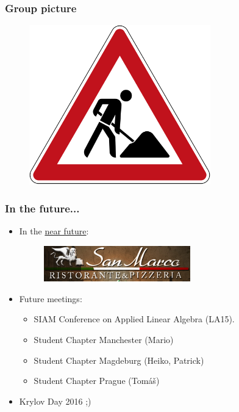 \documentclass{beamer}
\begin{document}
\begin{frame}
 \frametitle{Group picture}
   \begin{figure}[t]
   \vspace{-0.3cm}
  \includegraphics[width=0.7\textwidth]{pics/baustelle.png}
  \end{figure}
\end{frame}

\begin{frame}
 \frametitle{In the future...}
 \begin{itemize}
  \item In the \href{http://www.sanmarco.nl/}{near future}:
    \begin{figure}[t]
  \includegraphics[width=0.6\textwidth]{pics/sanmarco_logo.png}
  \end{figure}
  \pause
  \vspace{0.3cm}
  \item Future meetings:
  \begin{itemize}
  \item SIAM Conference on Applied Linear Algebra (LA15).
  \item Student Chapter Manchester (Mario)
  \item Student Chapter Magdeburg (Heiko, Patrick)
  \item Student Chapter Prague (Tom{\'a}{\v s})
  \end{itemize}
  \pause
  \item {\color{red}Krylov Day 2016 ;)}%
 \end{itemize}

\end{frame}
\end{document}
